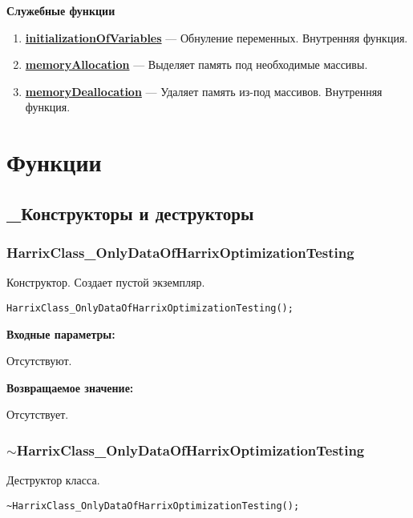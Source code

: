 \documentclass[a4paper,12pt]{article}
\begin{document}
\textbf{Служебные функции}
\begin{enumerate}
	
	\item \textbf{\hyperref[initializationOfVariables]{initializationOfVariables}} --- Обнуление переменных. Внутренняя функция.
	
	\item \textbf{\hyperref[memoryAllocation]{memoryAllocation}} --- Выделяет память под необходимые массивы.
	
	\item \textbf{\hyperref[memoryDeallocation]{memoryDeallocation}} --- Удаляет память из-под массивов. Внутренняя функция.
	
\end{enumerate}


\newpage
\section{Функции}
\subsection{\_Конструкторы и деструкторы}

\subsubsection{HarrixClass\_OnlyDataOfHarrixOptimizationTesting}\label{HarrixClass_OnlyDataOfHarrixOptimizationTesting}

Конструктор. Создает пустой экземпляр.


\begin{lstlisting}[label=code_syntax_HarrixClass_OnlyDataOfHarrixOptimizationTesting,caption=Синтаксис]
HarrixClass_OnlyDataOfHarrixOptimizationTesting();
\end{lstlisting}

\textbf{Входные параметры:}

Отсутствуют.

\textbf{Возвращаемое значение:}

Отсутствует.


\subsubsection{$\sim$HarrixClass\_OnlyDataOfHarrixOptimizationTesting}\label{tildaHarrixClass_OnlyDataOfHarrixOptimizationTesting}

Деструктор класса.


\begin{lstlisting}[label=code_syntax_tildaHarrixClass_OnlyDataOfHarrixOptimizationTesting,caption=Синтаксис]
~HarrixClass_OnlyDataOfHarrixOptimizationTesting();
\end{lstlisting}
\end{document}
